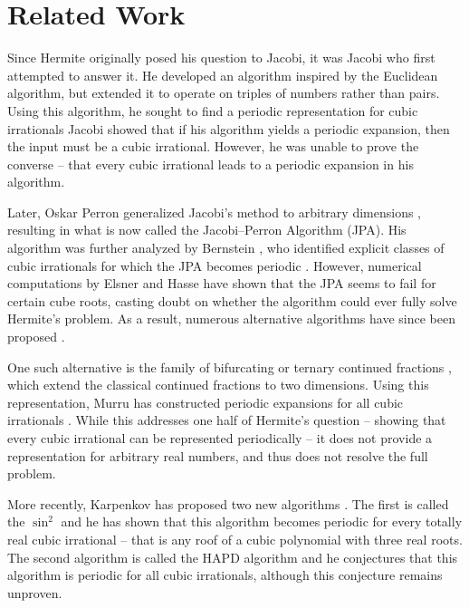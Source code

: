 \section{Related Work}

Since Hermite originally posed his question to Jacobi, it was Jacobi who first attempted to answer it.
He developed an algorithm inspired by the Euclidean algorithm,
but extended it to operate on triples of numbers rather than pairs.
Using this algorithm, he sought to find a periodic representation for cubic irrationals
Jacobi showed that if his algorithm yields a periodic expansion,
then the input must be a cubic irrational.
However, he was unable to prove the converse -- that every cubic irrational leads to a periodic expansion in his algorithm.

Later, Oskar Perron generalized Jacobi's method to arbitrary dimensions \cite{Perron07},
resulting in what is now called the Jacobi–Perron Algorithm (JPA).
His algorithm was further analyzed by Bernstein \cite{Bernstein71},
who identified explicit classes of cubic irrationals for which the JPA
becomes periodic \cite{Bernstein64A, Bernstein65, Bernstein64B}.
However, numerical computations by Elsner and Hasse \cite{Elsner67} have shown
that the JPA seems to fail for certain cube roots,
casting doubt on whether the algorithm could ever fully solve Hermite’s
problem.
As a result, numerous alternative algorithms have since been proposed
\cite{Schweiger00, Hendy81, Schweiger13}.

One such alternative is the family of bifurcating or ternary continued
fractions \cite{Gupta00},
which extend the classical continued fractions to two dimensions.
Using this representation, Murru has constructed periodic expansions for all cubic irrationals \cite{Murru15}.
While this addresses one half of Hermite’s question -- showing that every cubic
irrational can be represented periodically -- it does not provide a
representation for arbitrary real numbers, and thus does not resolve the full
problem.

More recently, Karpenkov has proposed two new algorithms \cite{Karpenkov21, Karpenkov24}.
The first is called the $\sin^2$ and he has shown that this algorithm
becomes periodic for every totally real cubic irrational -- that is any roof of
a cubic polynomial with three real roots.
The second algorithm is called the HAPD algorithm \cite{Karpenkov24} and he
conjectures that this algorithm is periodic for all cubic irrationals,
although this conjecture remains unproven.

